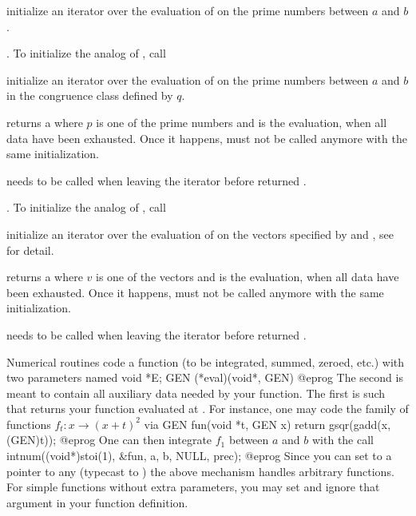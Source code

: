 initialize an iterator over the evaluation of  on the prime numbers
between $a$ and $b$.

\item {}. To initialize the analog of
, call

initialize an iterator over the evaluation of  on the prime numbers
between $a$ and $b$ in the congruence class defined by $q$.

 returns a 
\kbd{[p,code(p)]} where $p$ is one of the prime numbers and  is
the evaluation,  when all data have been exhausted. Once it happens,
must not be called anymore with the same initialization.

 needs to be called when leaving
the iterator before  returned .

\item {}. To initialize the analog of
, call

initialize an iterator over the evaluation of  on the vectors
specified by  and , see  for detail.

 returns a  \kbd{[v,code(v)]}
where $v$ is one of the vectors and  is the evaluation, 
when all data have been exhausted.  Once it happens, 
must not be called anymore with the same initialization.

 needs to be called when leaving the
iterator before  returned .


Numerical routines code a function (to be integrated, summed, zeroed, etc.)
with two parameters named
\bprog
  void *E;
  GEN (*eval)(void*, GEN)
@eprog\noindent
The second is meant to contain all auxiliary data needed by your function.
The first is such that  returns your function evaluated at
. For instance, one may code the family of functions
$f_t: x \to (x+t)^2$ via
\bprog
GEN fun(void *t, GEN x) { return gsqr(gadd(x, (GEN)t)); }
@eprog\noindent
One can then integrate $f_1$ between $a$ and $b$ with the call
\bprog
intnum((void*)stoi(1), &fun, a, b, NULL, prec);
@eprog\noindent
Since you can set  to a pointer to any  (typecast to
) the above mechanism handles arbitrary functions. For simple
functions without extra parameters, you may set  and ignore
that argument in your function definition.

